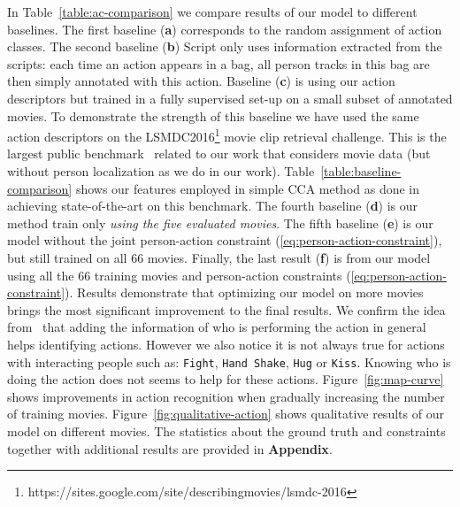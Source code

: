 \documentclass[10pt,twocolumn,letterpaper]{article}
\begin{document}
In Table~\ref{table:ac-comparison} we compare results of our model to different baselines. The first baseline (\textbf{a}) corresponds to the random assignment of action classes.
The second baseline (\textbf{b}) Script only uses information extracted from the scripts: each time an action appears in a bag, all person tracks in this bag are then simply annotated with this action. 
Baseline (\textbf{c}) is using our action descriptors but trained in a fully supervised set-up on a small subset of annotated movies.
To demonstrate the strength of this baseline we have used the same action descriptors on the LSMDC2016\footnote{https://sites.google.com/site/describingmovies/lsmdc-2016}
movie clip retrieval challenge. This is the largest public benchmark~\cite{rohrbach15dataset} related to our work that considers movie data (but without person localization as we do in our work).
Table~\ref{table:baseline-comparison} shows our features employed in simple CCA method as done in~\cite{levi16videodescription} achieving state-of-the-art on this benchmark.
The fourth baseline (\textbf{d}) is our method train only \emph{using the five evaluated movies}. 
The fifth baseline (\textbf{e}) is our model without the joint person-action constraint (\ref{eq:person-action-constraint}), but still trained on all 66 movies. 
Finally, the last result (\textbf{f}) is from our model using all the 66 training movies and person-action constraints (\ref{eq:person-action-constraint}).
Results demonstrate that optimizing our model on more movies brings the most significant improvement to the final results.
We confirm the idea from~\cite{bojanowski13finding} that adding the information of who is performing the action in general helps identifying actions.
However we also notice it is not always true for actions with interacting people such as: \texttt{Fight}, \texttt{Hand Shake}, \texttt{Hug} or \texttt{Kiss}.
Knowing who is doing the action does not seems to help for these actions.
Figure~\ref{fig:map-curve} shows improvements in action recognition when gradually increasing the number of training movies. Figure~\ref{fig:qualitative-action} shows qualitative results of our model on different movies. The statistics about the ground truth and constraints together with additional results are provided in {\bf Appendix}.
\end{document}

